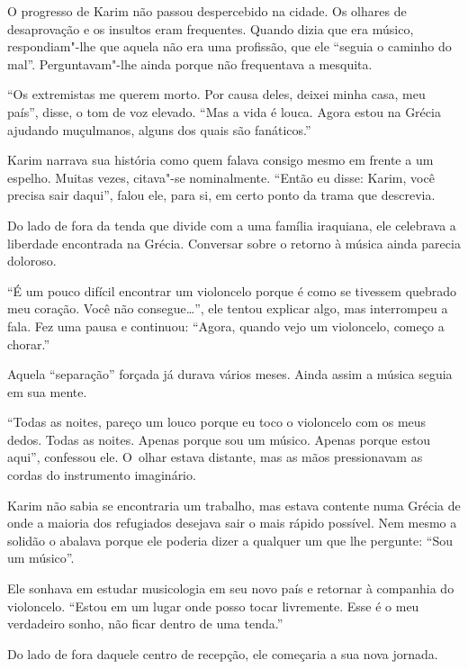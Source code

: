 O progresso de Karim não passou despercebido na cidade. Os olhares de
desaprovação e os insultos eram frequentes. Quando dizia que era músico,
respondiam"-lhe que aquela não era uma profissão, que ele ``seguia o
caminho do mal''. Perguntavam"-lhe ainda porque não frequentava a
mesquita.

``Os extremistas me querem morto. Por causa deles, deixei minha casa,
meu país'', disse, o tom de voz elevado. ``Mas a vida é louca. Agora
estou na Grécia ajudando muçulmanos, alguns dos quais são fanáticos.''

Karim narrava sua história como quem falava consigo mesmo em frente a um
espelho. Muitas vezes, citava"-se nominalmente. ``Então eu disse: Karim,
você precisa sair daqui'', falou ele, para si, em certo ponto da trama
que descrevia.

Do lado de fora da tenda que divide com a uma família iraquiana, ele
celebrava a liberdade encontrada na Grécia. Conversar sobre o retorno à
música ainda parecia doloroso.

``É um pouco difícil encontrar um violoncelo porque é como se tivessem
quebrado meu coração. Você não consegue…'', ele tentou explicar
algo, mas interrompeu a fala. Fez uma pausa e continuou: ``Agora, quando
vejo um violoncelo, começo a chorar.''

Aquela ``separação'' forçada já durava vários meses. Ainda assim a
música seguia em sua mente.

``Todas as noites, pareço um louco porque eu toco o violoncelo com os
meus dedos. Todas as noites. Apenas porque sou um músico. Apenas porque
estou aqui'', confessou ele. O~olhar estava distante, mas as mãos
pressionavam as cordas do instrumento imaginário.

Karim não sabia se encontraria um trabalho, mas estava contente numa
Grécia de onde a maioria dos refugiados desejava sair o mais rápido
possível. Nem mesmo a solidão o abalava porque ele poderia dizer a
qualquer um que lhe pergunte: ``Sou um músico''.

Ele sonhava em estudar musicologia em seu novo país e retornar à
companhia do violoncelo. ``Estou em um lugar onde posso tocar
livremente. Esse é o meu verdadeiro sonho, não ficar dentro de uma
tenda.'' 

Do lado de fora daquele centro de recepção, ele começaria a sua nova
jornada.



